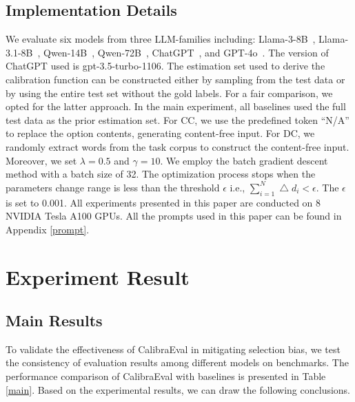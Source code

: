 \documentclass[sigconf]{acmart}
\begin{document}
\subsection{Implementation Details}
We evaluate six models from three LLM-families including: Llama-3-8B~\cite{touvron2023llama}, Llama-3.1-8B~\cite{touvron2023llama}, Qwen-14B~\cite{bai2023qwen}, Qwen-72B~\cite{bai2023qwen}, ChatGPT~\cite{openai2023gpt4}, and GPT-4o~\cite{openai2023gpt4}. The version of ChatGPT used is gpt-3.5-turbo-1106.
The estimation set used to derive the calibration function can be constructed either by sampling from the test data or by using the entire test set without the gold labels. For a fair comparison, we opted for the latter approach. In the main experiment, all baselines used the full test data as the prior estimation set.
For CC, we use the predefined token ``N/A'' to replace the option contents, generating content-free input. For DC, we randomly extract words from the task corpus to construct the content-free input.
Moreover, we set $\lambda=0.5$ and $\gamma=10$. We employ the batch gradient descent method with a batch size of 32. The optimization process stops when the parameters change range is less than the threshold $\epsilon$ i.e., 
$\sum_{i=1}^{N}\bigtriangleup d_i < \epsilon$. The $\epsilon$ is set to 0.001. All experiments presented in this paper are conducted on 8 NVIDIA Tesla A100 GPUs. All the prompts used in this paper can be found in Appendix \ref{prompt}.
 
 

\section{Experiment Result}
\subsection{Main Results}
To validate the effectiveness of CalibraEval in mitigating selection bias, we test the consistency of evaluation results among different models on benchmarks. The performance comparison of CalibraEval with baselines is presented in Table \ref{main}. Based on the experimental results, we can draw the following conclusions.
\end{document}
